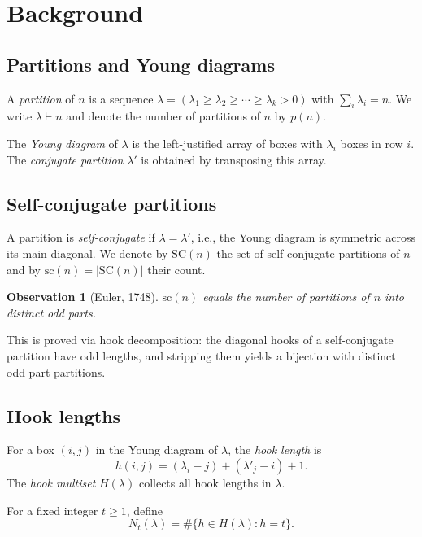 \documentclass[11pt,reqno]{amsart}
\newtheorem{observation}[theorem]{Observation}
\begin{document}
\section{Background}

\subsection{Partitions and Young diagrams}

A \emph{partition} of $n$ is a sequence 
$\lambda = (\lambda_1 \geq \lambda_2 \geq \cdots \geq \lambda_k > 0)$ 
with $\sum_i \lambda_i = n$. We write $\lambda \vdash n$ and 
denote the number of partitions of $n$ by $p(n)$.

The \emph{Young diagram} of $\lambda$ is the left-justified 
array of boxes with $\lambda_i$ boxes in row $i$. The 
\emph{conjugate partition} $\lambda'$ is obtained by 
transposing this array.

\subsection{Self-conjugate partitions}

A partition is \emph{self-conjugate} if $\lambda = \lambda'$, 
i.e., the Young diagram is symmetric across its main diagonal. 
We denote by $\mathrm{SC}(n)$ the set of self-conjugate 
partitions of $n$ and by $\mathrm{sc}(n) = |\mathrm{SC}(n)|$ 
their count.

\begin{observation}[Euler, 1748]
$\mathrm{sc}(n)$ equals the number of partitions of $n$ into 
distinct odd parts.
\end{observation}

This is proved via hook decomposition: the diagonal hooks of 
a self-conjugate partition have odd lengths, and stripping them 
yields a bijection with distinct odd part partitions.

\subsection{Hook lengths}

For a box $(i,j)$ in the Young diagram of $\lambda$, the 
\emph{hook length} is
\[
h(i,j) = (\lambda_i - j) + (\lambda'_j - i) + 1.
\]
The \emph{hook multiset} $H(\lambda)$ collects all hook 
lengths in $\lambda$.

For a fixed integer $t \geq 1$, define
\[
N_t(\lambda) = \#\{h \in H(\lambda) : h = t\}.
\]
\end{document}
